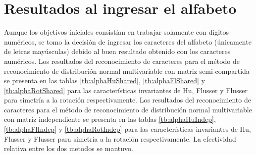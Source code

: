 \documentclass[a4paper, 11pt, oneside]{report}
\begin{document}
\section{Resultados al ingresar el alfabeto}

Aunque los objetivos iníciales consistían en trabajar solamente con dígitos numéricos, se tomo la decisión de ingresar los caracteres del alfabeto (únicamente de letras mayúsculas) debido al buen resultado obtenido con los caracteres numéricos. Los resultados del reconocimiento de caracteres para el método de reconocimiento de distribución normal multivariable con matriz semi-compartida se presenta en las tablas \ref{tb:alphaHuShared}, \ref{tb:alphaFlShared} y \ref{tb:alphaRotShared} para las características invariantes de Hu, Flusser y Flusser para simetría a la rotación respectivamente. Los resultados del reconocimiento de caracteres para el método de reconocimiento de distribución normal multivariable con matriz independiente se presenta en las tablas \ref{tb:alphaHuIndep}, \ref{tb:alphaFlIndep} y \ref{tb:alphaRotIndep} para las características invariantes de Hu, Flusser y Flusser para simetría a la rotación respectivamente. La efectividad relativa entre los dos metodos se mantuvo.
\end{document}
